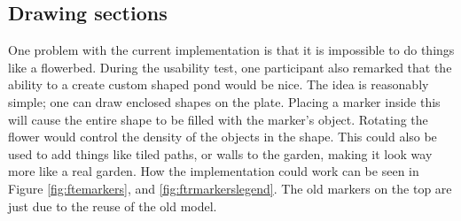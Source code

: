 \subsection*{Drawing sections}
One problem with the current implementation is that it is impossible to do things like a flowerbed. During the usability test, one participant also remarked that the ability to a create custom shaped pond would be nice. The idea is reasonably simple; one can draw enclosed shapes on the plate. Placing a marker inside this will cause the entire shape to be filled with the marker's object. Rotating the flower would control the density of the objects in the shape. This could also be used to add things like tiled paths, or walls to the garden, making it look way more like a real garden. How the implementation could work can be seen in Figure \ref{fig:ftemarkers}, and \ref{fig:ftrmarkerslegend}. The old markers on the top are just due to the reuse of the old model.
